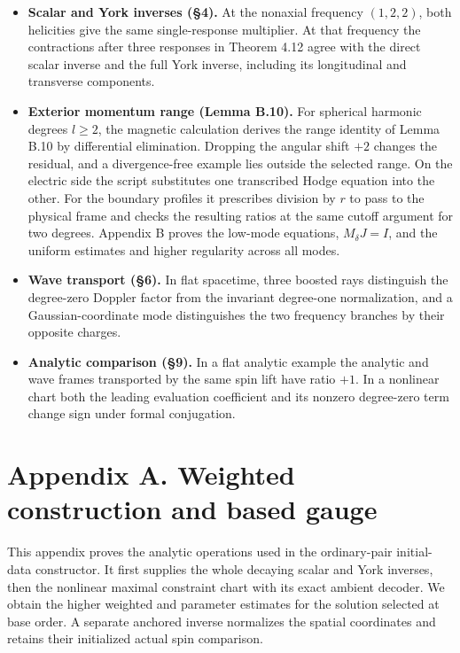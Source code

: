 \documentclass[
  english,
  11pt,
  reqno]{amsart}
\providecommand{\tightlist}{%
  \setlength{\itemsep}{0pt}\setlength{\parskip}{0pt}}
\begin{document}
\begin{itemize}
\tightlist
\item
  \textbf{Scalar and York inverses (§4).} At the nonaxial frequency
  \((1,2,2)\), both helicities give the same single-response multiplier.
  At that frequency the contractions after three responses in Theorem
  4.12 agree with the direct scalar inverse and the full York inverse,
  including its longitudinal and transverse components.
\item
  \textbf{Exterior momentum range (Lemma B.10).} For spherical harmonic
  degrees \(l\ge2\), the magnetic calculation derives the range identity
  of Lemma B.10 by differential elimination. Dropping the angular shift
  \(+2\) changes the residual, and a divergence-free example lies
  outside the selected range. On the electric side the script
  substitutes one transcribed Hodge equation into the other. For the
  boundary profiles it prescribes division by \(r\) to pass to the
  physical frame and checks the resulting ratios at the same cutoff
  argument for two degrees. Appendix B proves the low-mode equations,
  \(M_\delta J=I\), and the uniform estimates and higher regularity
  across all modes.
\item
  \textbf{Wave transport (§6).} In flat spacetime, three boosted rays
  distinguish the degree-zero Doppler factor from the invariant
  degree-one normalization, and a Gaussian-coordinate mode distinguishes
  the two frequency branches by their opposite charges.
\item
  \textbf{Analytic comparison (§9).} In a flat analytic example the
  analytic and wave frames transported by the same spin lift have ratio
  \(+1\). In a nonlinear chart both the leading evaluation coefficient
  and its nonzero degree-zero term change sign under formal conjugation.
\end{itemize}

\label{app:online-weighted-construction}

\section{Appendix A. Weighted construction and based
gauge}\label{appendix-a.-weighted-construction-and-based-gauge}

This appendix proves the analytic operations used in the ordinary-pair
initial-data constructor. It first supplies the whole decaying scalar
and York inverses, then the nonlinear maximal constraint chart with its
exact ambient decoder. We obtain the higher weighted and parameter
estimates for the solution selected at base order. A separate anchored
inverse normalizes the spatial coordinates and retains their initialized
actual spin comparison.
\end{document}
